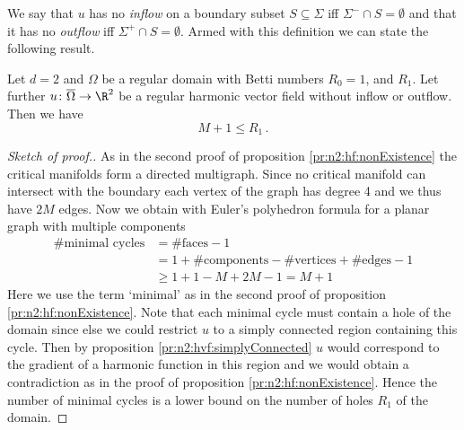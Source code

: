 We say that $u$ has no \emph{inflow} on a boundary subset $S\subseteq\Sigma$ iff $\Sigma^-\cap S=\emptyset$ and
that it has no \emph{outflow} iff $\Sigma^+\cap S=\emptyset$.
Armed with this definition we can state the following result.
\begin{proposition}
  Let $d=2$ and $\Omega$ be a regular domain with Betti numbers $R_0=1$, and $R_1$. Let further $u\colon\overline{\Omega}\to\R^2$ be 
  a regular harmonic vector field without inflow or outflow.
  Then we have $$M+1\leq R_1\,.$$
\end{proposition}
\begin{proof}[Sketch of proof.]
  As in the second proof of proposition \ref{pr:n2:hf:nonExistence} the critical manifolds form a directed multigraph.
  Since no critical manifold can intersect with the boundary each vertex
  of the graph has degree 4 and we thus have $2M$ edges. Now we obtain with Euler's polyhedron formula
  for a planar graph with multiple components
  \begin{align*}
    \text{\# minimal cycles}
    &= \text{\#faces}-1 \\
    &= 1+\text{\#components}-\text{\#vertices}+\text{\#edges} -1 \\
    &\geq 1+1-M+2M -1 = M+1
  \end{align*}
  Here we use the term `minimal' as in the second proof of proposition \ref{pr:n2:hf:nonExistence}.
  Note that each minimal cycle must contain a hole of the domain since else we could restrict $u$ to a simply
  connected region containing this cycle. Then by proposition \ref{pr:n2:hvf:simplyConnected} $u$ would correspond to the gradient of 
  a harmonic function in this region and we would obtain a contradiction as in the proof of proposition \ref{pr:n2:hf:nonExistence}.
  Hence the number of minimal cycles is a lower bound on the number of holes $R_1$ of the domain.
\end{proof}

